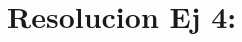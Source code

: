 \documentclass[twocolumn,aps,prl]{revtex4-1}
\begin{document}
% 
%                             
% 

\section{Resolucion Ej 4:}






\end{document}
